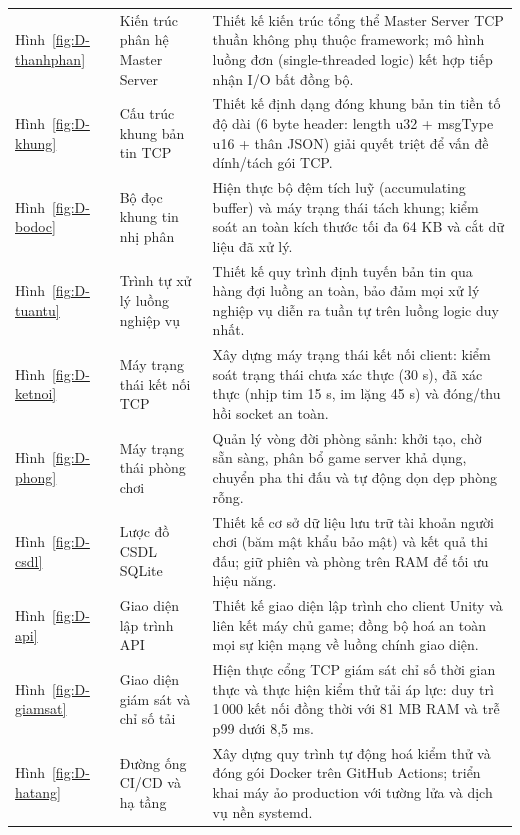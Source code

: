\begin{center}\small
\begin{tabularx}{\linewidth}{|L{2.2cm}|L{4.2cm}|Y|}
\hline
{} &  &  \\ \hline
Hình~\ref{fig:D-thanhphan} & Kiến trúc phân hệ Master Server & Thiết kế kiến trúc tổng thể Master Server TCP thuần không phụ thuộc framework; mô hình luồng đơn (single-threaded logic) kết hợp tiếp nhận I/O bất đồng bộ. \\ \hline
Hình~\ref{fig:D-khung} & Cấu trúc khung bản tin TCP & Thiết kế định dạng đóng khung bản tin tiền tố độ dài (6 byte header: length u32 + msgType u16 + thân JSON) giải quyết triệt để vấn đề dính/tách gói TCP. \\ \hline
Hình~\ref{fig:D-bodoc} & Bộ đọc khung tin nhị phân & Hiện thực bộ đệm tích luỹ (accumulating buffer) và máy trạng thái tách khung; kiểm soát an toàn kích thước tối đa 64 KB và cắt dữ liệu đã xử lý. \\ \hline
Hình~\ref{fig:D-tuantu} & Trình tự xử lý luồng nghiệp vụ & Thiết kế quy trình định tuyến bản tin qua hàng đợi luồng an toàn, bảo đảm mọi xử lý nghiệp vụ diễn ra tuần tự trên luồng logic duy nhất. \\ \hline
Hình~\ref{fig:D-ketnoi} & Máy trạng thái kết nối TCP & Xây dựng máy trạng thái kết nối client: kiểm soát trạng thái chưa xác thực (30 s), đã xác thực (nhịp tim 15 s, im lặng 45 s) và đóng/thu hồi socket an toàn. \\ \hline
Hình~\ref{fig:D-phong} & Máy trạng thái phòng chơi & Quản lý vòng đời phòng sảnh: khởi tạo, chờ sẵn sàng, phân bổ game server khả dụng, chuyển pha thi đấu và tự động dọn dẹp phòng rỗng. \\ \hline
Hình~\ref{fig:D-csdl} & Lược đồ CSDL SQLite & Thiết kế cơ sở dữ liệu lưu trữ tài khoản người chơi (băm mật khẩu bảo mật) và kết quả thi đấu; giữ phiên và phòng trên RAM để tối ưu hiệu năng. \\ \hline
Hình~\ref{fig:D-api} & Giao diện lập trình API & Thiết kế giao diện lập trình cho client Unity và liên kết máy chủ game; đồng bộ hoá an toàn mọi sự kiện mạng về luồng chính giao diện. \\ \hline
Hình~\ref{fig:D-giamsat} & Giao diện giám sát và chỉ số tải & Hiện thực cổng TCP giám sát chỉ số thời gian thực và thực hiện kiểm thử tải áp lực: duy trì 1\,000 kết nối đồng thời với 81 MB RAM và trễ p99 dưới 8,5 ms. \\ \hline
Hình~\ref{fig:D-hatang} & Đường ống CI/CD và hạ tầng & Xây dựng quy trình tự động hoá kiểm thử và đóng gói Docker trên GitHub Actions; triển khai máy ảo production với tường lửa và dịch vụ nền systemd. \\ \hline

\end{tabularx}
\end{center}
